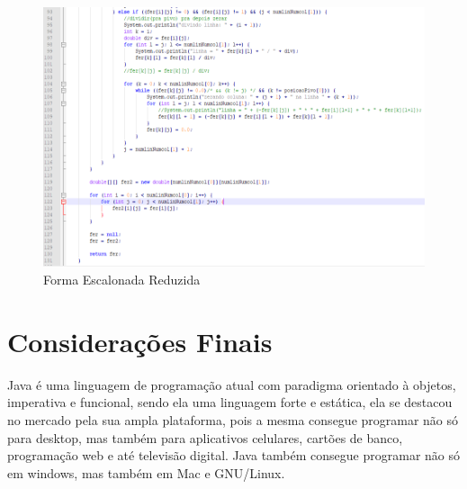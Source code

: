 \documentclass[
	12pt,				%
	openright,			%
	oneside,			%
	a4paper,			%
	english,			%
	french,				%
	spanish,			%
	brazil				%
	]{abntex2}
\begin{document}
\begin{figure}[!h]
\centering
  \includegraphics[width=0.83\linewidth]{fer2.png}
  \caption{Forma Escalonada Reduzida}
  \label{fig:Fer}
\end{figure}

{\let\clearpage\relax \chapter[Considerações Finais]{Considerações Finais}}

Java é uma linguagem de programação atual com paradigma orientado à objetos, imperativa e funcional, sendo ela uma linguagem forte e estática, ela se destacou no mercado pela sua ampla plataforma, pois a mesma consegue programar não só para desktop, mas também para aplicativos celulares, cartões de banco, programação web e até televisão digital. Java também consegue programar não só em windows, mas também em Mac e GNU/Linux.


\postextual

\nocite{100}
\nocite{101}
\nocite{1}
\nocite{2}
\nocite{3}
\nocite{4}
\nocite{5}
\nocite{6}
\nocite{7}
\nocite{8}
\nocite{9}
\nocite{10}



\end{document}
